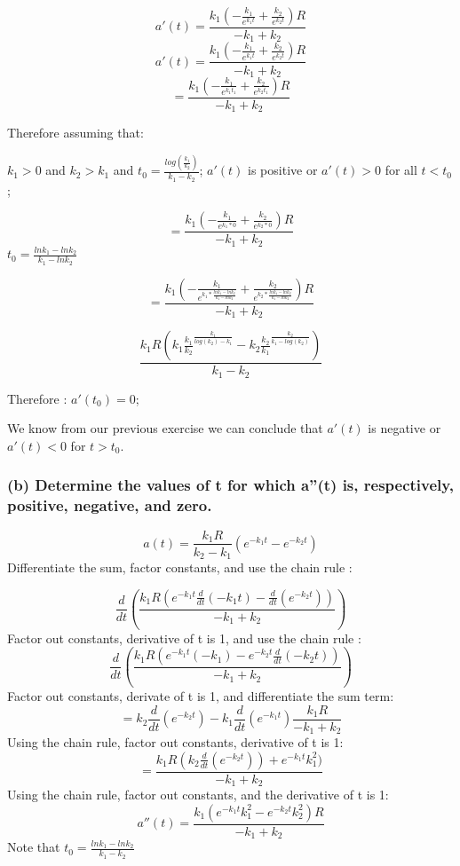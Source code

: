 \documentclass[]{article}
\begin{document}
\[a'(t) = \frac{k_1 ( -\frac{k_1}{e^{k_1t}}+\frac{k_2}{e^{k_2t}})R}{-k_1 + k_2}\]
\[a'(t) = \frac{k_1 ( -\frac{k_1}{e^{k_1t}}+\frac{k_2}{e^{k_2t}})R}{-k_1 + k_2}\]
\[= \frac{k_1 ( -\frac{k_1}{e^{k_1 t_1}}+\frac{k_2}{e^{k_2 t_1}})R}{-k_1 + k_2}\]

Therefore assuming that:

\(k_1 > 0\) and \(k_2 > k_1\) and
\(t_0 = \frac{log(\frac{k_1}{k_2})}{k_1 - k_2}\); \(a'(t)\) is positive
or \(a'(t) > 0\) for all \(t < t_0\);

\[= \frac{k_1 ( -\frac{k_1}{e^{k_1*0}}+\frac{k_2}{e^{k_2*0}})R}{-k_1 + k_2}\]
\(t_0 = \frac{ln k_1 - ln k_2}{k_1 - lnk_2}\)

\[= \frac{k_1 ( -\frac{k_1}{e^{k_1*\frac{ln k_1 - ln k_2}{k_1 - lnk_2}}}+\frac{k_2}{e^{k_2*\frac{ln k_1 - ln k_2}{k_1 - lnk_2}}})R}{-k_1 + k_2}\]

\[\frac{k_1 R (k_1 \frac{k_1}{k_2}^{\frac{k_1}{log(k_2)-k_1}} - k_2 \frac{k_2}{k_1}^{\frac{k_2}{k_1 - log(k_2)}})}{k_1 - k_2}\]

Therefore : \(a'(t_0) = 0\);

We know from our previous exercise we can conclude that \(a'(t)\) is
negative or \(a'(t) < 0\) for \(t > t_0\).

\subsubsection{(b) Determine the values of t for which a''(t) is,
respectively, positive, negative, and
zero.}\label{b-determine-the-values-of-t-for-which-at-is-respectively-positive-negative-and-zero.}

\[a(t) = \frac{k_1 R}{k_2-k_1}(e^{-k_1t} - e^{-k_2t})\] Differentiate
the sum, factor constants, and use the chain rule :

\[\frac{d}{dt}(\frac{k_1 R(e^{-k_1t}\frac{d}{dt}(-k_1t)-\frac{d}{dt}(e^{-k_2t}))}{-k_1 + k_2})\]
Factor out constants, derivative of t is 1, and use the chain rule :
\[\frac{d}{dt}(\frac{k_1R(e^{-k_1 t}(-k_1)- e^{-k_2t}\frac{d}{dt}(-k_2t))}{-k_1 + k_2})\]
Factor out constants, derivate of t is 1, and differentiate the sum
term:
\[= k_2 \frac{d}{dt}(e^{-k_2 t})-k_1\frac{d}{dt}(e^{-k_1t})\frac{k_1R}{-k_1 + k_2}\]
Using the chain rule, factor out constants, derivative of t is 1:
\[=\frac{k_1 R (k_2 \frac{d}{dt}(e^{-k_2t}))+e^{-k_1t}k_1^2)}{-k_1 + k_2}\]
Using the chain rule, factor out constants, and the derivative of t is
1: \[a''(t) = \frac{k_1(e^{-k_1 t}k_1^2-e^{-k_2 t}k_2^2)R}{-k_1+k_2}\]
Note that \(t_0 = \frac{ln k_1 - ln k_2}{k_1 - k_2}\)
\end{document}
